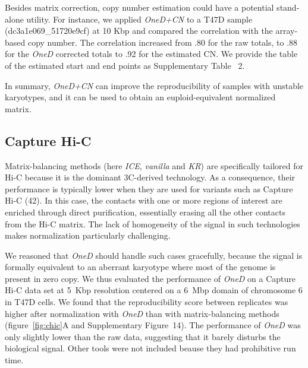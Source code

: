 \documentclass[a4,center,fleqn]{NAR}
\providecommand{\DIFadd}[1]{{\protect\color{red}#1}} %
\providecommand{\DIFdel}[1]{{\protect}}                      %
\providecommand{\DIFaddbegin}{} %
\providecommand{\DIFaddend}{} %
\providecommand{\DIFdelbegin}{} %
\providecommand{\DIFdelend}{} %
\begin{document}
Besides matrix correction, copy number estimation could have a potential stand-alone
utility. For instance, we applied \textit{OneD+CN} to a T47D sample
(dc3a1e069\_51720e9cf) at 10 Kbp and compared the correlation with the
array-based copy number. The correlation increased from .80 for the raw totals,
to .88 for the \textit{OneD} corrected totals to .92 for the estimated CN. We
provide the table of the estimated start and end points as Supplementary Table~
2.

In summary, \textit{OneD+CN} can improve the reproducibility of samples
with unstable karyotypes, and it can be used to obtain an
euploid-equivalent normalized matrix.


\subsection{Capture Hi-C}

Matrix-balancing methods (here \textit{ICE}, \textit{vanilla} and
\textit{KR}) are specifically tailored for Hi-C because it is the dominant
3C-derived technology. As a consequence, their performance is typically
lower when they are used for variants such as Capture Hi-C
(\DIFdelbegin \DIFdel{39}\DIFdelend \DIFaddbegin \DIFadd{42}\DIFaddend ). In this case, the contacts with one or more
regions of interest are enriched through direct purification, essentially
erasing all the other contacts from the Hi-C matrix. The lack of
homogeneity of the signal in such technologies makes normalization
particularly challenging.

We reasoned that \textit{OneD} should handle such cases gracefully,
because the signal is formally equivalent to an aberrant karyotype where
most of the genome is present in zero copy. We thus evaluated the
performance of \textit{OneD} on a Capture Hi-C data set at 5~Kbp
resolution centered on a 6~Mbp domain of chromosome 6 in T47D cells. We
found that the reproducibility score between replicates was higher after
normalization with \textit{OneD} than with matrix-balancing methods
(figure~\ref{fig:chic}A \DIFaddbegin \DIFadd{and Supplementary Figure~14}\DIFaddend ). The performance
of \textit{OneD} was only slightly lower than the raw data, suggesting
that it barely disturbs the biological signal. Other tools were not
included beause they had prohibitive run time.
\end{document}
